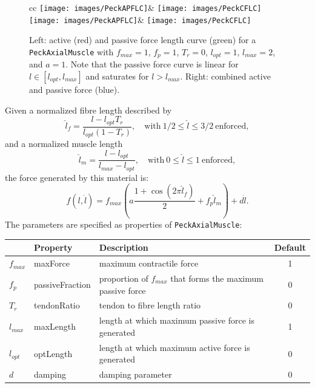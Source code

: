 \begin{figure}[ht]
\begin{center}
\begin{tabular}{cc}
   \iflatexml
      \texttt{[image: images/PeckAPFLC]}&
      \texttt{[image: images/PeckCFLC]}
   \else
      \texttt{[image: images/PeckAPFLC]}&
      \texttt{[image: images/PeckCFLC]}
   \fi
\end{tabular}
\end{center}
\caption{Left: active (red) and passive force length curve (green)
for a {\tt PeckAxialMuscle} with $f_{max} = 1$, $f_{p} = 1$, $T_r =
0$, $l_{opt} = 1$, $l_{max} = 2$, and $a = 1$. Note that the passive
force curve is linear for $l \in [l_{opt}, l_{max}]$ and saturates for
$l > l_{max}$. Right: combined active and passive force (blue).}
\label{PeckCurves:fig}
\end{figure}

Given a normalized fibre length described by
%
\begin{equation}
\hat l_f = \frac{l - l_{opt} T_r}{l_{opt} (1 - T_r)}, 
\quad \mathrm{with}~ 1/2 \le \hat l \le 3/2~\mathrm{enforced},
\end{equation}
%
and a normalized muscle length 
%
\begin{equation}
\hat l_m = \frac{l - l_{opt}}{l_{max} - l_{opt}}, 
\quad \mathrm{with}~ 0 \le \hat l \le 1~\mathrm{enforced},
\end{equation}
%
the force generated by this material is:
%
\begin{equation}
f(l, \dot l) = 
f_{max} \left( a \frac{1 + \cos(2 \pi \hat l_f)}{2} +  f_{p} \hat l_m \right) + d \dot l.
\label{PeckAxialMuscle:eqn}
\end{equation}
%
The parameters are specified as properties of {\tt PeckAxialMuscle}:

\begin{center}
\begin{tabular}{|l|l|l|c|} \hline
 & Property & Description & Default \\
\hline
$f_{max}$ & {\sf maxForce} & maximum contractile force & 1 \\
$f_{p}$ & {\sf passiveFraction} & 
proportion of $f_{max}$ that forms the maximum passive force & 0 \\
$T_r$ & {\sf tendonRatio} & tendon to fibre length ratio & 0 \\
$l_{max}$ & {\sf maxLength} & 
length at which maximum passive force is generated & 1 \\
$l_{opt}$ & {\sf optLength} & 
length at which maximum active force is generated & 0 \\
$d$ & {\sf damping} & damping parameter & 0 \\ 
\hline
\end{tabular}
\end{center}

